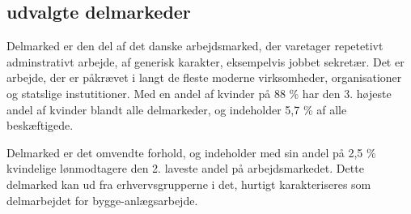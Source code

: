 








%
\subsection{udvalgte delmarkeder}
%

Delmarked  er den del af det danske arbejdsmarked, der varetager repetetivt adminstrativt arbejde, af generisk karakter, eksempelvis jobbet sekretær. Det er arbejde, der er påkrævet i langt de fleste moderne virksomheder, organisationer og statslige instutitioner. Med en andel af kvinder på 88 \% har  den  3. højeste andel af kvinder blandt alle delmarkeder, og indeholder 5,7 \% af alle beskæftigede. 

Delmarked  er det omvendte forhold, og indeholder med sin andel på 2,5 \% kvindelige lønmodtagere den 2. laveste andel på arbejdsmarkedet. Dette delmarked kan ud fra erhvervsgrupperne i det, hurtigt karakteriseres som delmarbejdet for bygge-anlægsarbejde. %

